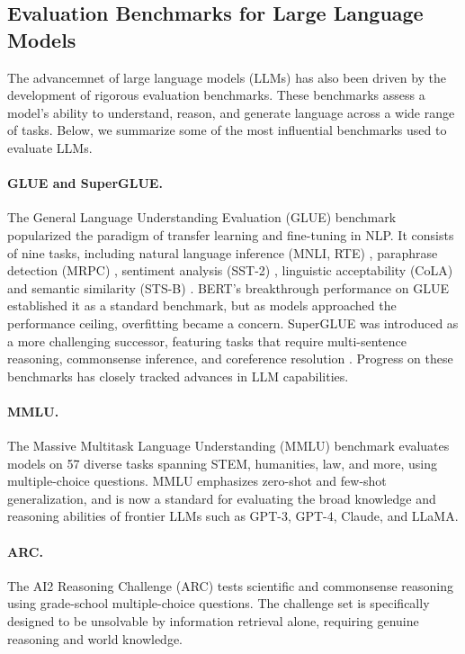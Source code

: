 \subsection{Evaluation Benchmarks for Large Language Models}
The advancemnet of large language models (LLMs) has also been driven by the development of rigorous evaluation benchmarks. These benchmarks assess a model's ability to understand, reason, and generate language across a wide range of tasks. Below, we summarize some of the most influential benchmarks used to evaluate LLMs.
\paragraph{GLUE and SuperGLUE.} The General Language Understanding Evaluation (GLUE) benchmark \citep{wang2018glue} popularized the paradigm of transfer learning and fine-tuning in NLP. It consists of nine tasks, including natural language inference (MNLI, RTE) \citep{williams2018mnli,dagan2006rte}, paraphrase detection (MRPC) \citep{dolan2005mrpc}, sentiment analysis (SST-2) \citep{socher2013sst}, linguistic acceptability (CoLA) \citep{warstadt2019cola} and semantic similarity (STS-B) \citep{cer2017stsb}. BERT's breakthrough performance on GLUE established it as a standard benchmark, but as models approached the performance ceiling, overfitting became a concern. SuperGLUE \citep{wang2019superglue} was introduced as a more challenging successor, featuring tasks that require multi-sentence reasoning, commonsense inference, and coreference resolution \citep{zhang2018record,pilehvar2019wic,khashabi2018multirc,roemmele2011copa}. Progress on these benchmarks has closely tracked advances in LLM capabilities.

\paragraph{MMLU.} The Massive Multitask Language Understanding (MMLU) benchmark \citep{hendrycks2021mmlu} evaluates models on 57 diverse tasks spanning STEM, humanities, law, and more, using multiple-choice questions. MMLU emphasizes zero-shot and few-shot generalization, and is now a standard for evaluating the broad knowledge and reasoning abilities of frontier LLMs such as GPT-3, GPT-4, Claude, and LLaMA.

\paragraph{ARC.} The AI2 Reasoning Challenge (ARC) \citep{clark2018arc} tests scientific and commonsense reasoning using grade-school multiple-choice questions. The challenge set is specifically designed to be unsolvable by information retrieval alone, requiring genuine reasoning and world knowledge.

